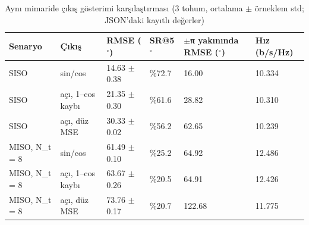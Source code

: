 \begin{table}[t]
\centering
\caption{Aynı mimaride çıkış gösterimi karşılaştırması (3 tohum, ortalama $\pm$ örneklem std; JSON'daki kayıtlı değerler)}
\begin{tabular}{llllll}
\toprule
Senaryo & Çıkış & RMSE ($^\circ$) & SR@5$^\circ$ & $\pm$π yakınında RMSE ($^\circ$) & Hız (b/s/Hz) \\
\midrule
SISO & sin/cos & 14.63 $\pm$ 0.38 & \%72.7 & 16.00 & 10.334 \\
SISO & açı, 1--cos kaybı & 21.35 $\pm$ 0.30 & \%61.6 & 28.82 & 10.310 \\
SISO & açı, düz MSE & 30.33 $\pm$ 0.02 & \%56.2 & 62.65 & 10.239 \\
MISO, N\_t = 8 & sin/cos & 61.49 $\pm$ 0.10 & \%25.2 & 64.92 & 12.486 \\
MISO, N\_t = 8 & açı, 1--cos kaybı & 63.67 $\pm$ 0.26 & \%20.5 & 64.91 & 12.426 \\
MISO, N\_t = 8 & açı, düz MSE & 73.76 $\pm$ 0.17 & \%20.7 & 122.68 & 11.775 \\
\bottomrule
\end{tabular}
\end{table}
